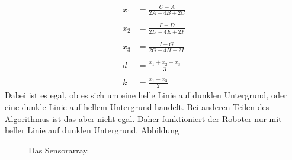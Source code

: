 \documentclass[a4paper,bibtotoc,oneside]{scrbook}
\begin{document}
\begin{align*}
  x_1 &= \frac{C-A}{2A-4B+2C} \\
  \\
  x_2 &=  \frac{F-D}{2D-4E+2F} \\
  \\
  x_3 &=  \frac{I-G}{2G-4H+2I} \\
  \\
  d &=  \frac{x_1+x_2+x_3}{3} \\
  \\
  k &=  \frac{x_1-x_3}{2}
\end{align*}
Dabei ist es egal, ob es sich um eine helle Linie auf dunklen Untergrund, oder eine dunkle Linie auf hellem Untergrund handelt. Bei anderen Teilen des Algorithmus ist das aber nicht egal. Daher funktioniert der Roboter nur mit heller Linie auf dunklen Untergrund.  Abbildung 

\begin{figure}
\centering
\caption{Das Sensorarray.}
\label{arr}
\end{figure} 
\end{document}
